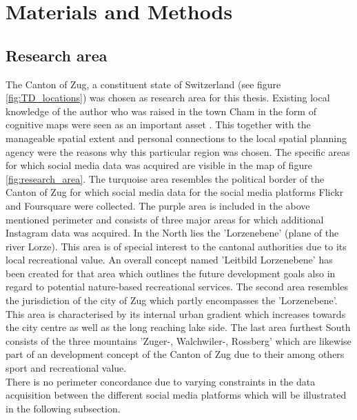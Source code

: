 \chapter{Materials and Methods} \label{material_methods}

\section{Research area} \label{research_area}
The Canton of Zug, a constituent state of Switzerland (see figure \ref{fig:TD_locations}) was chosen as research area for this thesis. Existing local knowledge of the author who was raised in the town Cham in the form of cognitive maps were seen as an important asset \parencite{BenjaminKuipers}. This together with the manageable spatial extent and personal connections to the local spatial planning agency were the reasons why this particular region was chosen. The specific areas for which social media data was acquired are visible in the map of figure \ref{fig:research_area}. The turquoise area resembles the political border of the Canton of Zug for which social media data for the social media platforms Flickr and Foursquare were collected. The purple area is included in the above mentioned perimeter and consists of three major areas for which additional Instagram data was acquired. In the North lies the 'Lorzenebene' (plane of the river Lorze). This area is of special interest to the cantonal authorities due to its local recreational value. An overall concept named 'Leitbild Lorzenebene'  \parencite{BaudirektiondesKantonsZug2012} has been created for that area which outlines the future development goals also in regard to potential nature-based recreational services. The second area resembles the jurisdiction of the city of Zug which partly encompasses the 'Lorzenebene'. This area is characterised by its internal urban gradient which increases towards the city centre as well as the long reaching lake side. The last area furthest South consists of the three mountains 'Zuger-, Walchwiler-, Rossberg' which are likewise part of an development concept \parencite{Berchtold2011} of the Canton of Zug due to their among others sport and recreational value. \\
There is no perimeter concordance due to varying constraints in the data acquisition between the different social media platforms which will be illustrated in the following subsection.

